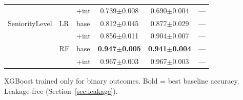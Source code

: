 \documentclass[conference]{IEEEtran}
\begin{document}
\begin{table}[htb]
{\begin{tabular}{lllccc}
& & +int & 0.739$\pm$0.008 & 0.690$\pm$0.004 & --- \\
SeniorityLevel & LR & base & 0.812$\pm$0.045 & 0.877$\pm$0.029 & --- \\
& & +int & 0.856$\pm$0.011 & 0.904$\pm$0.007 & --- \\
& RF & base & \textbf{0.947$\pm$0.005} & \textbf{0.941$\pm$0.004} & --- \\
& & +int & 0.967$\pm$0.003 & 0.967$\pm$0.003 & --- \\
\hline
\end{tabular}
}
\par\vspace{2pt}
\small{XGBoost trained only for binary outcomes. Bold = best baseline accuracy. Leakage-free (Section~\ref{sec:leakage}).}
\end{table}
\end{document}
